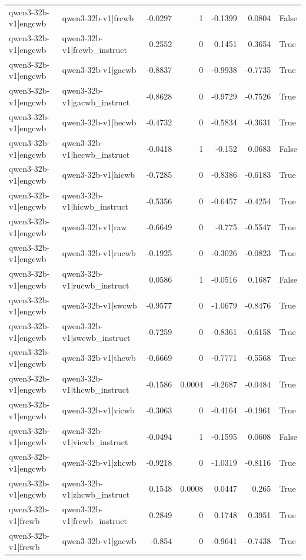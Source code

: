 \begin{table}
\begin{tabular}{l l r r r r l}
qwen3-32b-v1|engcwb & qwen3-32b-v1|frcwb & -0.0297 & 1 & -0.1399 & 0.0804 & False \\
qwen3-32b-v1|engcwb & qwen3-32b-v1|frcwb_instruct & 0.2552 & 0 & 0.1451 & 0.3654 & True \\
qwen3-32b-v1|engcwb & qwen3-32b-v1|gacwb & -0.8837 & 0 & -0.9938 & -0.7735 & True \\
qwen3-32b-v1|engcwb & qwen3-32b-v1|gacwb_instruct & -0.8628 & 0 & -0.9729 & -0.7526 & True \\
qwen3-32b-v1|engcwb & qwen3-32b-v1|hecwb & -0.4732 & 0 & -0.5834 & -0.3631 & True \\
qwen3-32b-v1|engcwb & qwen3-32b-v1|hecwb_instruct & -0.0418 & 1 & -0.152 & 0.0683 & False \\
qwen3-32b-v1|engcwb & qwen3-32b-v1|hicwb & -0.7285 & 0 & -0.8386 & -0.6183 & True \\
qwen3-32b-v1|engcwb & qwen3-32b-v1|hicwb_instruct & -0.5356 & 0 & -0.6457 & -0.4254 & True \\
qwen3-32b-v1|engcwb & qwen3-32b-v1|raw & -0.6649 & 0 & -0.775 & -0.5547 & True \\
qwen3-32b-v1|engcwb & qwen3-32b-v1|rucwb & -0.1925 & 0 & -0.3026 & -0.0823 & True \\
qwen3-32b-v1|engcwb & qwen3-32b-v1|rucwb_instruct & 0.0586 & 1 & -0.0516 & 0.1687 & False \\
qwen3-32b-v1|engcwb & qwen3-32b-v1|swcwb & -0.9577 & 0 & -1.0679 & -0.8476 & True \\
qwen3-32b-v1|engcwb & qwen3-32b-v1|swcwb_instruct & -0.7259 & 0 & -0.8361 & -0.6158 & True \\
qwen3-32b-v1|engcwb & qwen3-32b-v1|thcwb & -0.6669 & 0 & -0.7771 & -0.5568 & True \\
qwen3-32b-v1|engcwb & qwen3-32b-v1|thcwb_instruct & -0.1586 & 0.0004 & -0.2687 & -0.0484 & True \\
qwen3-32b-v1|engcwb & qwen3-32b-v1|vicwb & -0.3063 & 0 & -0.4164 & -0.1961 & True \\
qwen3-32b-v1|engcwb & qwen3-32b-v1|vicwb_instruct & -0.0494 & 1 & -0.1595 & 0.0608 & False \\
qwen3-32b-v1|engcwb & qwen3-32b-v1|zhcwb & -0.9218 & 0 & -1.0319 & -0.8116 & True \\
qwen3-32b-v1|engcwb & qwen3-32b-v1|zhcwb_instruct & 0.1548 & 0.0008 & 0.0447 & 0.265 & True \\
qwen3-32b-v1|frcwb & qwen3-32b-v1|frcwb_instruct & 0.2849 & 0 & 0.1748 & 0.3951 & True \\
qwen3-32b-v1|frcwb & qwen3-32b-v1|gacwb & -0.854 & 0 & -0.9641 & -0.7438 & True \\

\end{tabular}
\end{table}

